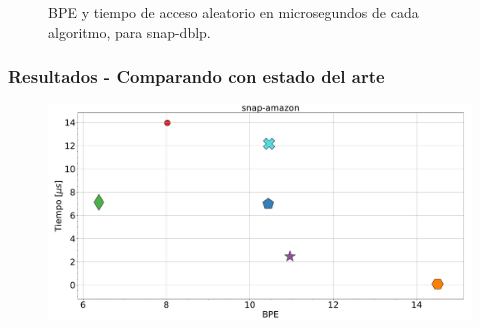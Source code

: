 \begin{frame}
\begin{figure}
\begin{minipage}{1\textwidth}
\begin{minipage}{0.15\textwidth}
    		\end{minipage}	
    	\end{minipage}

	\caption{BPE y tiempo de acceso aleatorio en microsegundos de cada algoritmo, para snap-dblp.}
\end{figure}

\end{frame}

\begin{frame}
\frametitle{Resultados - Comparando con estado del arte}

\begin{figure}
	\centering
	
    	\begin{minipage}{1\textwidth}
    		\centering
    		\begin{minipage}{0.8\textwidth}
    			\centering
    			\includegraphics[width=1\linewidth]{../img/bpeTimes/aleatorio/snap-amazon.pdf}
    		\end{minipage}
    		\begin{minipage}{0.15\textwidth}
    			\centering

\end{minipage}
\end{minipage}
\end{figure}
\end{frame}
